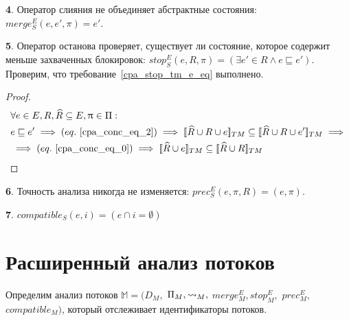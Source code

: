 {\textbf 4.} Оператор слияния не объединяет абстрактные состояния: $merge^E_S(e, e', \pi) = e'$.

{\textbf 5.} Оператор останова проверяет, существует ли состояние, которое содержит меньше захваченных блокировок: $stop^E_S(e, R, \pi) = (\exists e' \in R \land e \sqsubseteq e')$.
Проверим, что требование~\ref{cpa_stop_tm_e_eq} выполнено.
\begin{proof}
\begin{align}
&\forall e \in E, R, \widehat{R} \subseteq E, \pi \in \Pi: \nonumber \\
& e \sqsubseteq e' \implies (eq.~\ref{cpa_conc_eq_2}) \implies \conctm{\widehat{R} \cup R \cup e} \subseteq \conctm{\widehat{R} \cup R \cup e'} \implies \nonumber \\
& \implies (eq.~\ref{cpa_conc_eq_0}) \implies \conctm{\widehat{R} \cup e} \subseteq \conctm{\widehat{R} \cup R} \nonumber
\end{align}
\end{proof}

{\textbf 6.} Точность анализа никогда не изменяется: $prec^E_S(e, \pi, R) = (e, \pi)$.

{\textbf 7.} $compatible_S(e,i) = (e \cap i = \emptyset)$

\section{Расширенный анализ потоков}
\label{sect_simple_extended_thread_analysis}

Определим анализ потоков
$\mathbb{M}=(D_{M},$ $\Pi_{M}, \leadsto_{M},$ $merge^E_{M}, stop^E_{M},$ $prec^E_{M},$ $compatible_{M})$, который отслеживает идентификаторы потоков.

